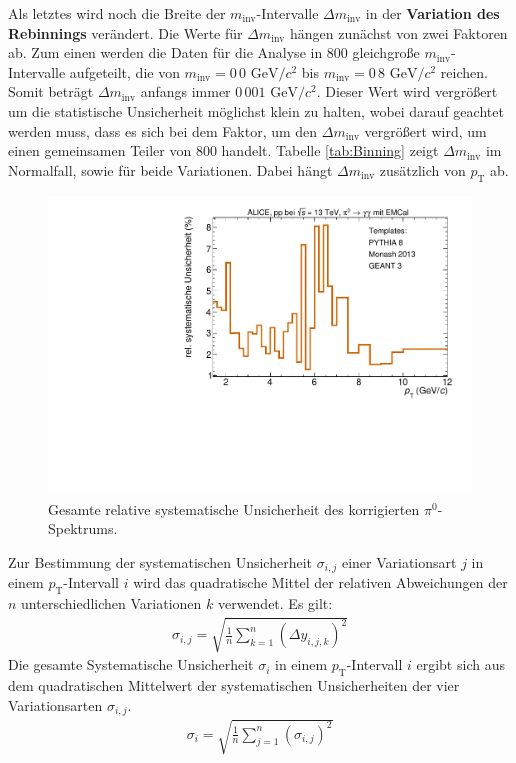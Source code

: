 \newline
Als letztes wird noch die Breite der $m_\text{inv}$-Intervalle $\Delta m_\text{inv}$ in der \textbf{Variation des Rebinnings} verändert.
Die Werte für $\Delta m_\text{inv}$ hängen zunächst von zwei Faktoren ab.
Zum einen werden die Daten für die Analyse in $800$ gleichgroße $m_\text{inv}$-Intervalle aufgeteilt, die von $m_\text{inv} = 0\,0 \text{ GeV}/c^{2}$ bis $m_\text{inv} = 0\,8 \text{ GeV}/c^{2}$ reichen.
Somit beträgt $\Delta m_\text{inv}$ anfangs immer $0\,001 \text{ GeV}/c^{2}$.
Dieser Wert wird vergrößert um die statistische Unsicherheit möglichst klein zu halten, wobei darauf geachtet werden muss, dass es sich bei dem Faktor, um den $\Delta m_\text{inv}$ vergrößert wird, um einen gemeinsamen Teiler von $800$ handelt.
Tabelle \ref{tab:Binning} zeigt $\Delta m_\text{inv}$ im Normalfall, sowie für beide Variationen.
Dabei hängt $\Delta m_\text{inv}$ zusätzlich von $p_\text{T}$ ab.
\begin{figure}[t!]
\centering
\includegraphics[width=.65\linewidth]{SystematischeUnsicherheit_Data_2016.pdf}
\caption{Gesamte relative systematische Unsicherheit des korrigierten $\pi^ {0}$-Spektrums.}
\label{fig:SysUncer}
\end{figure}
\newline
Zur Bestimmung der systematischen Unsicherheit $\sigma_{i,j}$ einer Variationsart $j$ in einem $p_\text{T}$-Intervall $i$ wird das quadratische Mittel der relativen Abweichungen der $n$ unterschiedlichen Variationen $k$ verwendet.
Es gilt:
\begin{align}
\sigma_{i,j} = \sqrt{\frac{1}{n}\sum_{k=1}^{n}\left(\Delta y_{i,j,k}\right)^{2}}
\end{align}
Die gesamte Systematische Unsicherheit $\sigma_{i}$ in einem $p_\text{T}$-Intervall $i$ ergibt sich aus dem quadratischen Mittelwert der systematischen Unsicherheiten der vier Variationsarten $\sigma_{i,j}$.
\begin{align}
\sigma_{i} = \sqrt{\frac{1}{n}\sum_{j=1}^{n}\left(\sigma_{i,j}\right)^{2}}
\end{align}
